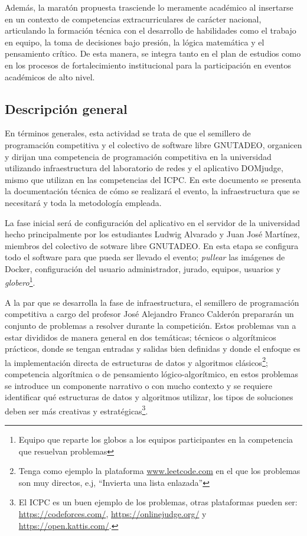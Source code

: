\documentclass{article}
\begin{document}
Además, la maratón propuesta trasciende lo meramente académico al insertarse en un contexto de competencias extracurriculares de carácter nacional, articulando la formación técnica con el desarrollo de habilidades como el trabajo en equipo, la toma de decisiones bajo presión, la lógica matemática y el pensamiento crítico. De esta manera, se integra tanto en el plan de estudios como en los procesos de fortalecimiento institucional para la participación en eventos académicos de alto nivel.


\subsection{Descripción general}

En términos generales, esta actividad se trata de que el semillero de programación competitiva y el colectivo de software libre GNUTADEO, organicen y dirijan una competencia de programación competitiva en la universidad utilizando infraestructura del laboratorio de redes y el aplicativo DOMjudge\cite{domjudge-docs}, mismo que utilizan en las competencias del ICPC\cite{domjudge-about}. En este documento se presenta la documentación técnica de cómo se realizará el evento, la infraestructura que se necesitará y toda la metodología empleada.


La fase inicial será de configuración del aplicativo en el servidor de la universidad hecho principalmente por los estudiantes Ludwig Alvarado y Juan José Martínez, miembros del colectivo de sotware libre GNUTADEO. En esta etapa se configura todo el software para que pueda ser llevado el evento; \textit{pullear} las imágenes de Docker\cite{domjudge-judgehost,domjudge-domserver}, configuración del usuario administrador, jurado, equipos, usuarios y \textit{globero}\footnote{Equipo que reparte los globos a los equipos participantes en la competencia que resuelvan problemas}.


A la par que se desarrolla la fase de infraestructura, el semillero de programación competitiva a cargo del profesor José Alejandro Franco Calderón prepararán un conjunto de problemas a resolver durante la competición. Estos problemas van a estar divididos de manera general en dos temáticas; técnicos o algorítmicos prácticos, donde se tengan entradas y salidas bien definidas y donde el enfoque es la implementación directa de estructuras de datos y algoritmos clásicos\footnote{Tenga como ejemplo la plataforma \url{www.leetcode.com}\cite{leetcode} en el que los problemas son muy directos, e.j, ``Invierta una lista enlazada''}; competencia algorítmica o de pensamiento lógico-algorítmico, en estos problemas se introduce un componente narrativo o con mucho contexto y se requiere identificar qué estructuras de datos y algoritmos utilizar, los tipos de soluciones deben ser más creativas y estratégicas\footnote{El ICPC es un buen ejemplo de los problemas, otras plataformas pueden ser: \url{https://codeforces.com/}, \url{https://onlinejudge.org/} y \url{https://open.kattis.com/}. }.
\end{document}

